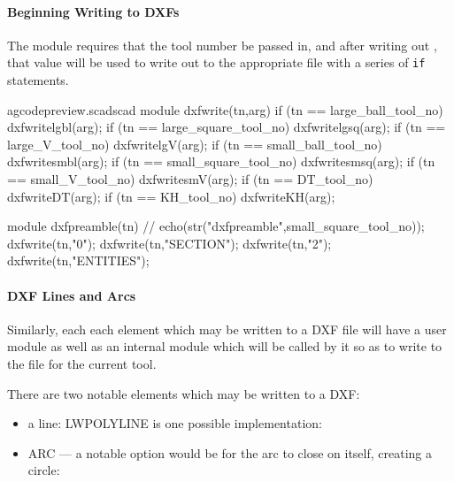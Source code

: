 \documentclass{ltxdoc}
\begin{document}
\paragraph{Beginning Writing to DXFs}%
The  module requires that the tool number be passed in, 
and after writing out , that value will be used to write out to the appropriate file with a series of \texttt{if} statements.
 
\lstset{firstnumber=\thegcpscad}
\begin{writecode}{a}{gcodepreview.scad}{scad}
module dxfwrite(tn,arg) {
if (tn == large_ball_tool_no) {
    dxfwritelgbl(arg);}
if (tn == large_square_tool_no) {
    dxfwritelgsq(arg);}
if (tn == large_V_tool_no) {
    dxfwritelgV(arg);}
if (tn == small_ball_tool_no) {
    dxfwritesmbl(arg);}
if (tn == small_square_tool_no) {
    dxfwritesmsq(arg);}
if (tn == small_V_tool_no) {
    dxfwritesmV(arg);}
if (tn == DT_tool_no) {
    dxfwriteDT(arg);}
if (tn == KH_tool_no) {
    dxfwriteKH(arg);}
}

module dxfpreamble(tn) {
//    echo(str("dxfpreamble",small_square_tool_no));
    dxfwrite(tn,"0");
    dxfwrite(tn,"SECTION");
    dxfwrite(tn,"2");
    dxfwrite(tn,"ENTITIES");
}

\end{writecode}
\addtocounter{gcpscad}{27}

 
\paragraph{DXF Lines and Arcs}%
Similarly, each each element which may be written to a DXF file will have a user module
as well as an internal module which will be called by it so as to write to the file
for the current tool.
 
There are two notable elements which may be written to a DXF:

\begin{itemize}
 \item a line: LWPOLYLINE is one possible implementation:  
 \item ARC --- a notable option would be for the arc to close on itself, creating a circle:
\end{itemize}
 
\end{document}
